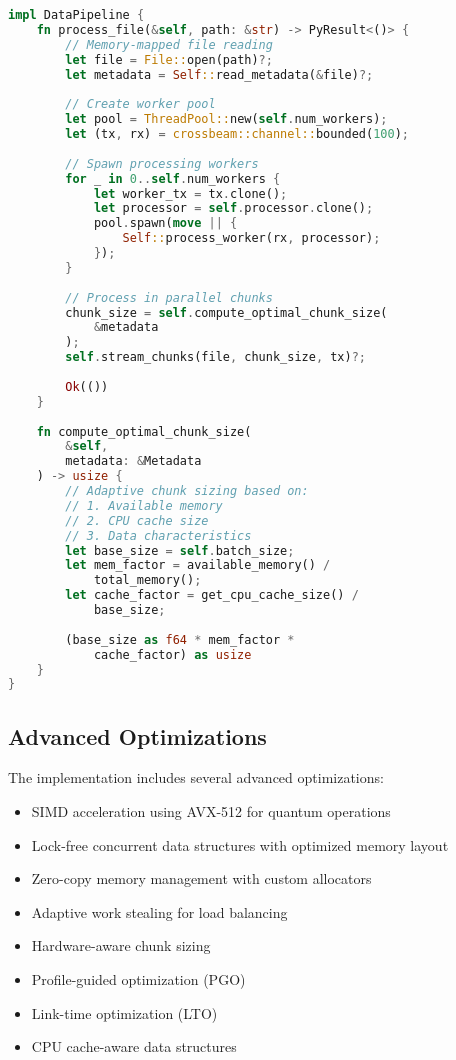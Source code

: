 \documentclass[10pt,twocolumn]{article}
\begin{document}
\begin{lstlisting}[language=Rust]
impl DataPipeline {
    fn process_file(&self, path: &str) -> PyResult<()> {
        // Memory-mapped file reading
        let file = File::open(path)?;
        let metadata = Self::read_metadata(&file)?;
        
        // Create worker pool
        let pool = ThreadPool::new(self.num_workers);
        let (tx, rx) = crossbeam::channel::bounded(100);
        
        // Spawn processing workers
        for _ in 0..self.num_workers {
            let worker_tx = tx.clone();
            let processor = self.processor.clone();
            pool.spawn(move || {
                Self::process_worker(rx, processor);
            });
        }
        
        // Process in parallel chunks
        chunk_size = self.compute_optimal_chunk_size(
            &metadata
        );
        self.stream_chunks(file, chunk_size, tx)?;
        
        Ok(())
    }
    
    fn compute_optimal_chunk_size(
        &self,
        metadata: &Metadata
    ) -> usize {
        // Adaptive chunk sizing based on:
        // 1. Available memory
        // 2. CPU cache size
        // 3. Data characteristics
        let base_size = self.batch_size;
        let mem_factor = available_memory() / 
            total_memory();
        let cache_factor = get_cpu_cache_size() / 
            base_size;
            
        (base_size as f64 * mem_factor * 
            cache_factor) as usize
    }
}
\end{lstlisting}

\subsection{Advanced Optimizations}
The implementation includes several advanced optimizations:

\begin{itemize}
    \item SIMD acceleration using AVX-512 for quantum operations
    \item Lock-free concurrent data structures with optimized memory layout
    \item Zero-copy memory management with custom allocators
    \item Adaptive work stealing for load balancing
    \item Hardware-aware chunk sizing
    \item Profile-guided optimization (PGO)
    \item Link-time optimization (LTO)
    \item CPU cache-aware data structures
\end{itemize}
\end{document}

